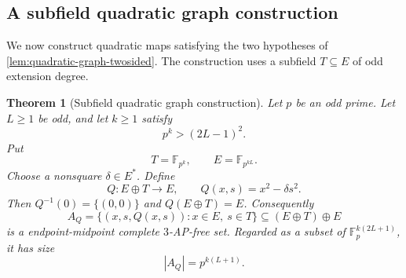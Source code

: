 \documentclass[11pt]{article}
\newtheorem{theorem}{Theorem}[section]
\newcommand{\F}{\mathbb F}
\begin{document}
	\subsection{A subfield quadratic graph construction}
	
	We now construct quadratic maps satisfying the two hypotheses of
	\cref{lem:quadratic-graph-twosided}.  The construction uses a subfield
	$T\subseteq E$ of odd extension degree.
	
	\begin{theorem}[Subfield quadratic graph construction]\label{thm:subfieldflag}
		Let $p$ be an odd prime.  Let $L\ge1$ be odd, and let $k\ge1$ satisfy
		\[
		p^k>(2L-1)^2 .
		\]
		Put
		\[
		T=\F_{p^k},
		\qquad
		E=\F_{p^{kL}} .
		\]
		Choose a nonsquare $\delta\in E^*$.  Define
		\[
		Q:E\oplus T\longrightarrow E,
		\qquad
		Q(x,s)=x^2-\delta s^2 .
		\]
		Then $Q^{-1}(0)=\{(0,0)\}$ and $Q(E\oplus T)=E$.  Consequently
		\[
		A_Q=\{(x,s,Q(x,s)):x\in E,\ s\in T\}
		\subseteq (E\oplus T)\oplus E
		\]
		is a endpoint-midpoint complete  $3$-AP-free set. Regarded as a subset of $\F_p^{k(2L+1)}$, it has size
		\[
		|A_Q|=p^{k(L+1)} .
		\]
	\end{theorem}
	
\end{document}
